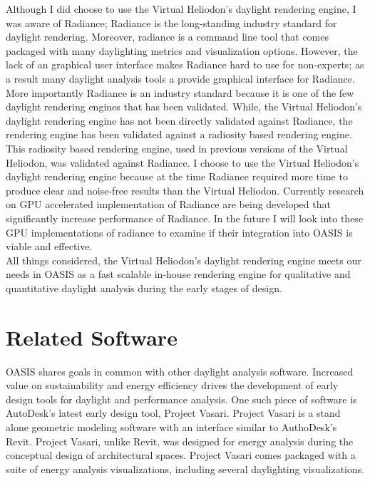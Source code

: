 	Although I did choose to use the Virtual Heliodon's daylight rendering engine, I was aware of Radiance;
	Radiance is the long-standing industry standard for daylight rendering.
	Moreover, radiance is a command line tool that comes packaged with many daylighting metrics and visualization options.
	However, the lack of an graphical user interface makes Radiance hard to use for non-experts; as a result many daylight analysis tools a provide graphical interface for Radiance.
	More importantly Radiance is an industry standard because it is one of the few daylight rendering engines that has been validated\cite{mcneil2013validation}.
	While, the Virtual Heliodon's daylight rendering engine has not been directly validated against Radiance, the rendering engine has been validated against a radiosity based rendering engine.
	This radiosity based rendering engine, used in previous versions of the Virtual Heliodon, was validated against Radiance\cite{sheng2010global}. 
	I choose to use the Virtual Heliodon's daylight rendering engine because at the time Radiance required more time to produce clear and noise-free results than the Virtual Heliodon\cite{compagnon1997radiance}. 
	Currently research on GPU accelerated implementation of Radiance are being developed that significantly increase performance of Radiance\cite{zuo2012acceleration}.
	In the future I will look into these GPU implementations of radiance to examine if their integration into OASIS is viable and effective.
	\\

	All things considered, the Virtual Heliodon's daylight rendering engine meets our needs in OASIS as a fast scalable in-house rendering engine for qualitative and quantitative daylight analysis during the early stages of design.

\section{Related Software}


	OASIS shares goals in common with other daylight analysis software.
	Increased value on sustainability and energy efficiency drives the development of early design tools for daylight and performance analysis.
	One such piece of software is AutoDesk's latest early design tool, Project Vasari\cite{todo,todo}.
	Project Vasari is a stand alone geometric modeling software with an interface similar to AuthoDesk's Revit\cite{todo}.
	Project Vasari, unlike Revit, was designed for energy analysis during the conceptual design of architectural spaces. 
	Project Vasari comes packaged with a suite of energy analysis visualizations, including several daylighting visualizations.\\


